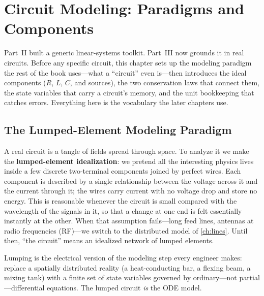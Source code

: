 \chapter{Circuit Modeling: Paradigms and Components}
\label{ch:foundations}
Part~II built a generic linear-systems toolkit. Part~III
now grounds it in real circuits. Before any specific circuit, this chapter sets up
the modeling paradigm the rest of the book uses---what a ``circuit'' even
is---then introduces the ideal components (\(R\), \(L\), \(C\), and sources), the
two conservation laws that connect them, the state variables that carry a
circuit's memory, and the unit bookkeeping that catches errors. Everything here is
the vocabulary the later chapters use.

\section{The Lumped-Element Modeling Paradigm}
A real circuit is a tangle of fields spread through space. To analyze it we make
the \textbf{lumped-element idealization}: we pretend all the interesting physics
lives inside a few discrete two-terminal components joined by perfect wires. Each
component is described by a single relationship between the voltage across it and
the current through it; the wires carry current with no voltage drop and store no
energy. This is reasonable whenever the circuit is small compared with the wavelength of
the signals in it, so that a change at one end is felt essentially instantly at the
other. When that assumption fails---long feed lines, antennas at radio
frequencies (RF)---we switch to
the distributed model of \cref{ch:lines}. Until then, ``the circuit'' means an
idealized network of lumped elements.

\begin{controlsbox}
Lumping is the electrical version of the modeling step every engineer makes:
replace a spatially distributed reality (a heat-conducting bar, a flexing beam,
a mixing tank) with a finite set of state variables governed by ordinary---not
partial---differential equations. The lumped circuit \emph{is} the ODE model.
\end{controlsbox}

